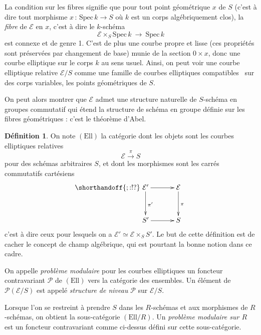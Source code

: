 \documentclass[11pt,a4paper]{article}
\newcommand{\E}{\mathcal{E}}
\renewcommand{\Pr}{\mathcal{P}}
\newcommand{\vers}{\longrightarrow}
\newcommand{\Ell}{\mathrm{Ell}}
\newcommand{\Spec}{\mathrm{Spec}\,}
\newcommand{\de}{\,:\,}
\theoremstyle{definition}
\newtheorem*{defi}{Définition}
\begin{document}
La condition sur les fibres signifie que pour tout point géométrique $x$ de $S$ (c'est à dire tout morphisme $x\de\Spec k\vers S$ où $k$ est un corps algébriquement clos), la \emph{fibre} de $\E$ en $x$, c'est à dire le $k$-schéma
$$\E \times_S \Spec k\ \vers\ \Spec k$$
est connexe et de genre 1. C'est de plus une courbe propre et lisse (ces propriétés sont préservées par changement de base) munie de la section $0 \times x$, donc une courbe elliptique sur le corps $k$ au sens usuel. Ainsi, on peut voir une courbe elliptique relative $\E/S$ comme une famille de courbes elliptiques \og compatibles \fg\ sur des corps variables, les points géométriques de $S$.

On peut alors montrer que $\E$ admet une structure naturelle de $S$-schéma en groupes commutatif qui étend la structure de schéma en groupe définie sur les fibres géométriques : c'est le théorème d'Abel.

\begin{defi}
On note $(\Ell)$ la catégorie dont les objets sont les courbes elliptiques relatives
$$\E \overset{\pi}{\vers} S$$
pour des schémas arbitraires $S$, et dont les morphismes sont les carrés commutatifs cartésiens
$$
\shorthandoff{;:!?}
\xymatrix @!=8mm {
\E' \ar[d]^{\pi'} \ar[r]  & \E \ar[d]^{\pi} \\
 S' \ar[r] & S
}
$$
c'est à dire ceux pour lesquels on a $\E' \simeq \E \times_S S'$. Le but de cette définition est de cacher le concept de champ algébrique, qui est pourtant la bonne notion dans ce cadre.

On appelle \emph{problème modulaire} pour les courbes elliptiques un foncteur contravariant $\Pr$ de $(\Ell)$ vers la catégorie des ensembles. Un élément de $\Pr(\E/S)$ est appelé \emph{structure de niveau} $\Pr$ sur $\E/S$.

Lorsque l'on se restreint à prendre $S$ dans les $R$-schémas et aux morphismes de $R$-schémas, on obtient la sous-catégorie $(\Ell/R)$. Un \emph{problème modulaire sur $R$} est un foncteur contravariant comme ci-dessus défini sur cette sous-catégorie.
\end{defi}
\end{document}
